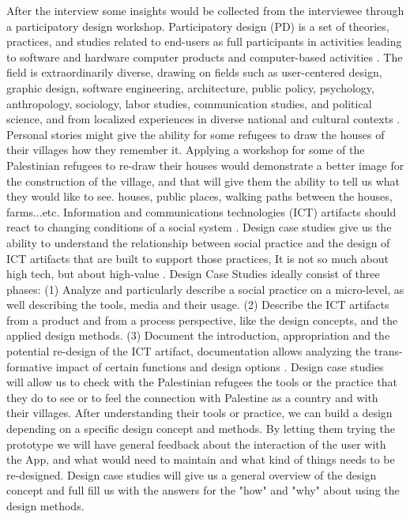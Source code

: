 After the interview some insights would be collected from the interviewee through a participatory design workshop. Participatory design (PD) is a set of theories, practices, and studies related to end-users as full participants in activities leading to software and hardware computer products and computer-based activities  \citep{Muller2003}. The field is extraordinarily diverse,  drawing on fields such as user-centered design, graphic design, software engineering, architecture, public policy, psychology, anthropology, sociology, labor studies, communication studies, and political science, and from localized experiences in diverse national and cultural contexts \citep{Gregory2003}.  Personal stories might give the ability for some refugees to draw the houses of their villages how they remember it. Applying a workshop for some of the Palestinian refugees to re-draw their houses would demonstrate a better image for the construction of the village, and that will give them the ability to tell us what they would like to see. houses, public places, walking paths between the houses, farms...etc. 
Information and communications technologies (ICT) artifacts should react to changing conditions of a social system \citep{Wulf2011}. Design case studies give us the ability to understand the relationship between social practice and the design of ICT artifacts that are built to support those practices, It is not so much about high tech, but about high-value \citep{Volker2013}. Design Case Studies ideally consist of three phases: (1) Analyze and particularly describe a social practice on a micro-level, as well describing the tools, media and their usage. (2) Describe the ICT artifacts from a product and from a process perspective, like the design concepts, and the applied design methods. (3) Document the introduction, appropriation and the potential re-design of the ICT artifact, documentation allows analyzing the trans-formative impact of certain functions and design options \citep{Volker2013}. Design case studies will allow us to check with the Palestinian refugees the tools or the practice that they do to see or to feel the connection with Palestine as a country and with their villages. After understanding their tools or practice, we can build a design depending on a specific design concept and methods. By letting them trying the prototype we will have general feedback about the interaction of the user with the App, and what would need to maintain and what kind of things needs to be re-designed. Design case studies will give us a general overview of the design concept and full fill us with the answers for the "how" and "why" about using the design methods.   
